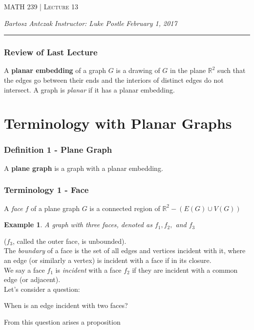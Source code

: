 \documentclass{report}
\newcommand{\lectureNum}{13}
\newcommand{\curDate}{February 1, 2017}
\newcommand{\course}{MATH 239}
\newcommand{\instructor}{Luke Postle}
\newtheorem{ex}{Example}[section]
\begin{document}
\begin{center}
\begin{Large}
\textsc{\course{} | Lecture \lectureNum{}}
\end{Large}
\end{center} 
\noindent \textit{Bartosz Antczak} \hfill
\textit{Instructor: \instructor{}} \hfill
\textit{\curDate{}}
\rule{\textwidth}{0.4pt}

\subsubsection{Review of Last Lecture}
A \textbf{planar embedding} of a graph $G$ is a drawing of $G$ in the plane $\mathbb{R}^2$ such that the edges go between their ends and the interiors of distinct edges do not intersect. A graph is \textit{planar} if it has a planar embedding.
\section{Terminology with Planar Graphs}
\subsubsection{Definition 1 - Plane Graph}
A \textbf{plane graph} is a graph with a planar embedding.
\subsubsection{Terminology 1 - Face}
A \textit{face} $f$ of a plane graph $G$ is a connected region of $\mathbb{R}^2 - (E(G) \cup V(G))$
\begin{ex}
A graph with three faces, denoted as $f_1, f_2,$ and $f_3$
\end{ex}
\begin{center}
\end{center}
($f_3$, called the outer face, is unbounded).\\
The \textit{boundary} of a face is the set of all edges and vertices incident with it, where an edge (or similarly a vertex) is incident with a face if in its closure.\\
We say a face $f_1$ is \textit{incident} with a face $f_2$ if they are incident with a common edge (or adjacent).
\\ Let's consider a question:
\begin{center}
When is an edge incident with two faces?
\end{center}
From this question arises a proposition
\end{document}
